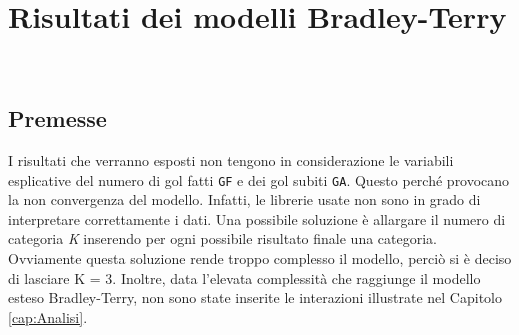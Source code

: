 
\chapter{Risultati dei modelli Bradley-Terry}
\label{cap:risultatiDM}

\\
\section {Premesse}
I risultati che verranno esposti non tengono in considerazione le variabili esplicative del numero di gol fatti \texttt {GF} e dei gol subiti \texttt{GA}. Questo perché provocano la non convergenza del modello. Infatti, le librerie usate non sono in grado di interpretare correttamente i dati. Una possibile soluzione è allargare il numero di categoria \emph{K} inserendo per ogni possibile risultato finale una categoria. Ovviamente questa soluzione rende troppo complesso il modello, perciò si è deciso di lasciare K = 3. Inoltre, data l'elevata complessità che raggiunge il modello esteso Bradley-Terry, non sono state inserite le interazioni illustrate nel Capitolo \ref{cap:Analisi}.

